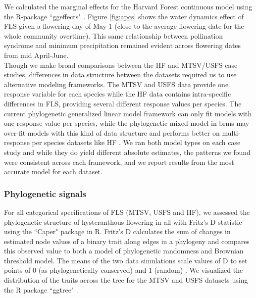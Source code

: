\documentclass[12pt]{article}\usepackage[]{graphicx}\usepackage[]{color}
\begin{document}
{%
%
%


\indent We calculated the marginal effects for the Harvard Forest continuous model using the R-package ``ggeffects" \citep{Ludecke2018}. Figure \ref{fig:apcs} shows the water dynamics effect of FLS given a flowering day of May 1 (close to the average flowering date for the whole community overtime). This same relationship between pollination syndrome and minimum precipitation remained evident across flowering dates from mid April-June. \\

\noindent Though we make broad comparisons between the HF and MTSV/USFS case studies, differences in data structure between the datasets required us to use alternative modeling frameworks. The MTSV and USFS data provide one response variable for each species while the HF data contains intra-specific differences in FLS, providing several different response values per species. The current phylogenetic generalized linear model framework can only fit models with one response value per species, while the phylogenetic mixed model in brms may over-fit models with this kind of data structure and performs better on multi-response per species datasets like HF \citep{BurknerPC}. We ran both model types on each case study and while they do yield different absolute estimates, the patterns we found were consistent across each framework, and we report results from the most accurate model for each dataset.\\

\subsubsection*{Phylogenetic signals}
For all categorical specifications of FLS (MTSV, USFS and HF), we assessed the phylogenetic structure of hysteranthous flowering in all  with Fritz's D-statistic \citep{FRITZ2010} using the ``Caper" package \citep{Orme2013} in R. Fritz's D calculates the sum of changes in estimated node values of a binary trait along edges in a phylogeny and compares this observed value to both a model of phylogenetic randomness and Brownian threshold model. The means of the two data simulations scale values of D to set points of 0 (as phylogenetically conserved) and 1 (random)  \citep{Orme2013}. We visualized the distribution of the traits across the tree for the MTSV and USFS datasets using the R package ``ggtree" \citep{Yu2017}.\\

}
\end{document}
